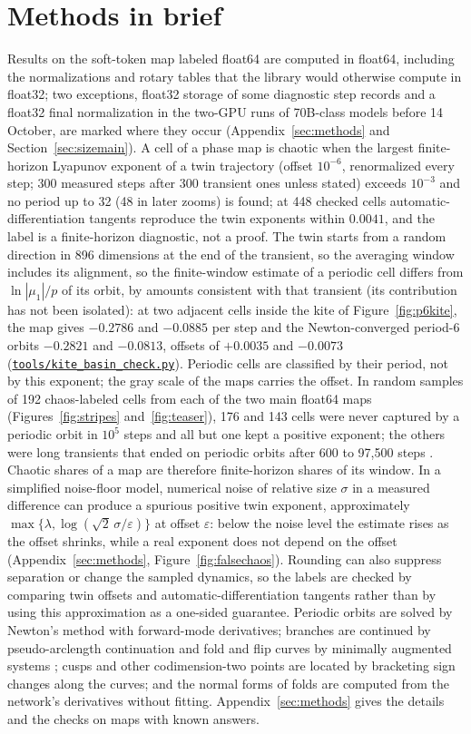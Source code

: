 \documentclass[11pt,letterpaper]{article}
\newcommand{\repourl}{https://github.com/tdj28/neural-shrimp}
\newcommand{\reporef}{arxiv-v1}
\newcommand{\repo}[1]{\href{\repourl/blob/\reporef/#1}{\nolinkurl{#1}}}
\begin{document}
\section{Methods in brief}
\label{sec:methodsbrief}
Results on the soft-token map labeled float64 are computed in float64, including the normalizations and rotary
tables that the library would otherwise compute in float32; two exceptions, float32 storage of some diagnostic step
records and a float32 final normalization in the two-GPU runs of 70B-class models before 14 October, are marked where they occur (Appendix~\ref{sec:methods} and Section~\ref{sec:sizemain}). A cell of a phase map is chaotic when the
largest finite-horizon Lyapunov exponent of a twin trajectory (offset $10^{-6}$, renormalized every step; 300
measured steps after 300 transient ones unless stated) exceeds $10^{-3}$ and no period up to 32 (48 in later zooms) is
found; at 448 checked cells automatic-differentiation tangents reproduce the twin exponents within $0.0041$, and the label is a finite-horizon diagnostic, not a proof. The twin starts from a random direction in 896 dimensions at the end of the transient, so the averaging window
includes its alignment, so the finite-window estimate of a periodic cell differs from $\ln|\mu_1|/p$
of its orbit, by amounts consistent with that transient (its contribution has not been isolated): at two adjacent cells inside the kite of Figure~\ref{fig:p6kite},
the map gives $-0.2786$ and $-0.0885$ per step and the Newton-converged period-6 orbits $-0.2821$ and $-0.0813$, offsets
of $+0.0035$ and $-0.0073$ (\repo{tools/kite_basin_check.py}). Periodic cells are classified by their period, not by
this exponent; the gray scale of the maps carries the offset. In random samples of 192 chaos-labeled cells from each of the two main float64 maps (Figures~\ref{fig:stripes} and~\ref{fig:teaser}), 176 and 143 cells were never captured by a periodic orbit in $10^5$ steps and all but one kept a positive exponent; the others were long transients that ended on periodic orbits after 600 to 97{,}500 steps \cite{grebogi1983crises}. Chaotic shares of a map are therefore finite-horizon shares of its window.
In a simplified noise-floor model, numerical noise of relative size $\sigma$ in a measured difference can produce a
spurious positive twin exponent, approximately $\max\{\lambda,\log(\sqrt2\,\sigma/\varepsilon)\}$ at offset
$\varepsilon$: below the noise level the estimate rises as the offset shrinks, while a real exponent does not depend
on the offset (Appendix~\ref{sec:methods}, Figure~\ref{fig:falsechaos}). Rounding can also suppress separation or
change the sampled dynamics, so the labels are checked by comparing twin offsets and automatic-differentiation
tangents rather than by using this approximation as a one-sided guarantee.
Periodic orbits are solved by Newton's method with forward-mode derivatives; branches are continued by pseudo-arclength
continuation and fold and flip curves by minimally augmented systems \cite{govaerts2000numerical,kuznetsov2023elements};
cusps and other codimension-two points are located by bracketing sign changes along the curves; and the normal forms
of folds are computed from the network's derivatives without fitting. Appendix~\ref{sec:methods} gives the details
and the checks on maps with known answers.
\end{document}
